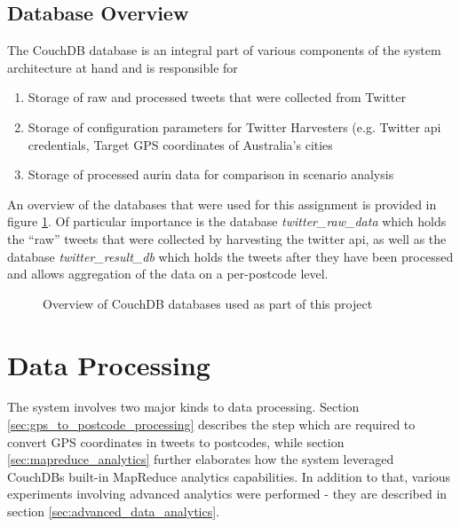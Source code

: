 \documentclass[11pt, oneside]{article}
\begin{document}
\subsection{Database Overview}
\label{sec:overview_databases}
The CouchDB database is an integral part of various components of the system architecture at hand and is responsible for
\begin{enumerate}
    \item Storage of raw and processed tweets that were collected from Twitter 
    \item Storage of configuration parameters for Twitter Harvesters (e.g. Twitter \acrshort{api} credentials, Target GPS coordinates of Australia's cities
    \item Storage of processed \acrshort{aurin} data for comparison in scenario analysis
\end{enumerate}
An overview of the databases that were used for this assignment is provided in figure \ref{fig:CouchDB_database_overview}. Of particular importance is the database \textit{twitter\_raw\_data} which holds the \enquote{raw} tweets that were collected by harvesting the twitter \acrshort{api}, as well as the database \textit{twitter\_result\_db} which holds the tweets after they have been processed and allows aggregation of the data on a per-postcode level.
\begin{figure}
  \begin{center}
  \end{center}
  \caption{Overview of CouchDB databases used as part of this project}
  \label{fig:CouchDB_database_overview}
\end{figure}

\section{Data Processing}
\label{sec:data_processing}
The system involves two major kinds to data processing. Section \ref{sec:gps_to_postcode_processing} describes the step which are required to convert GPS coordinates in tweets to postcodes, while section \ref{sec:mapreduce_analytics} further elaborates how the system leveraged CouchDBs built-in MapReduce analytics capabilities. In addition to that, various experiments involving advanced analytics were performed - they are described in section \ref{sec:advanced_data_analytics}.
\end{document}
